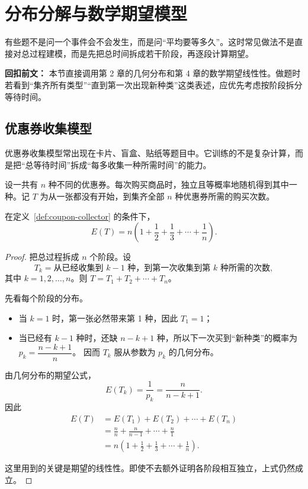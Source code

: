 ﻿\documentclass[lang=cn,11pt]{elegantbook}
\begin{document}
\section{分布分解与数学期望模型}

有些题不是问一个事件会不会发生，而是问“平均要等多久”。这时常见做法不是直接对总过程建模，而是先把总时间拆成若干阶段，再逐段计算期望。

\begin{note}
\textbf{回扣前文：} 本节直接调用第 2 章的几何分布和第 4 章的数学期望线性性。做题时若看到“集齐所有类型”“直到第一次出现新种类”这类表述，应优先考虑按阶段拆分等待时间。
\end{note}

\subsection{优惠券收集模型}

优惠券收集模型常出现在卡片、盲盒、贴纸等题目中。它训练的不是复杂计算，而是把“总等待时间”拆成“每多收集一种所需时间”的能力。

\begin{definition}[优惠券收集模型]\label{def:coupon-collector}
设一共有 \(n\) 种不同的优惠券。每次购买商品时，独立且等概率地随机得到其中一种。记 \(T\) 为从一张都没有开始，到集齐全部 \(n\) 种优惠券所需的购买次数。
\end{definition}

\begin{theorem}[集齐全部优惠券所需次数的期望]\label{thm:coupon-collector}
在定义~\ref{def:coupon-collector} 的条件下，
\[
E(T)=n\left(1+\frac12+\frac13+\cdots+\frac1n\right).
\]
\end{theorem}

\begin{proof}
把总过程拆成 \(n\) 个阶段。设
\[
T_k=\text{从已经收集到 }k-1\text{ 种，到第一次收集到第 }k\text{ 种所需的次数},
\]
其中 \(k=1,2,\dots,n\)。则 \(T=T_1+T_2+\cdots+T_n\)。

先看每个阶段的分布。
\begin{itemize}
    \item 当 \(k=1\) 时，第一张必然带来第 1 种，因此 \(T_1=1\)；
    \item 当已经有 \(k-1\) 种时，还缺 \(n-k+1\) 种，所以下一次买到“新种类”的概率为 \(p_k=\dfrac{n-k+1}{n}\)。
    因而 \(T_k\) 服从参数为 \(p_k\) 的几何分布。
\end{itemize}

由几何分布的期望公式，
\[
E(T_k)=\frac{1}{p_k}=\frac{n}{n-k+1}.
\]
因此
\begin{align*}
E(T)
&=E(T_1)+E(T_2)+\cdots+E(T_n) \\
&=\frac{n}{n}+\frac{n}{n-1}+\cdots+\frac{n}{1} \\
&=n\left(1+\frac12+\frac13+\cdots+\frac1n\right).
\end{align*}

这里用到的关键是期望的线性性。即使不去额外证明各阶段相互独立，上式仍然成立。
\end{proof}
\end{document}
